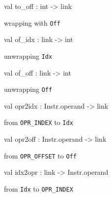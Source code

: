 \documentclass[11pt]{article}
\begin{document}
\label{val:Dex.to-underscoreoff}\begin{ocamldoccode}
val to_off : int -> link
\end{ocamldoccode}
\begin{ocamldocdescription}
wrapping with {\tt{Off}}


\end{ocamldocdescription}




\label{val:Dex.of-underscoreidx}\begin{ocamldoccode}
val of_idx : link -> int
\end{ocamldoccode}
\begin{ocamldocdescription}
unwrapping {\tt{Idx}}


\end{ocamldocdescription}




\label{val:Dex.of-underscoreoff}\begin{ocamldoccode}
val of_off : link -> int
\end{ocamldoccode}
\begin{ocamldocdescription}
unwrapping {\tt{Off}}


\end{ocamldocdescription}




\label{val:Dex.opr2idx}\begin{ocamldoccode}
val opr2idx : Instr.operand -> link
\end{ocamldoccode}
\begin{ocamldocdescription}
from {\tt{OPR\_INDEX}} to {\tt{Idx}}


\end{ocamldocdescription}




\label{val:Dex.opr2off}\begin{ocamldoccode}
val opr2off : Instr.operand -> link
\end{ocamldoccode}
\begin{ocamldocdescription}
from {\tt{OPR\_OFFSET}} to {\tt{Off}}


\end{ocamldocdescription}




\label{val:Dex.idx2opr}\begin{ocamldoccode}
val idx2opr : link -> Instr.operand
\end{ocamldoccode}
\begin{ocamldocdescription}
from {\tt{Idx}} to {\tt{OPR\_INDEX}}


\end{ocamldocdescription}
\end{document}
